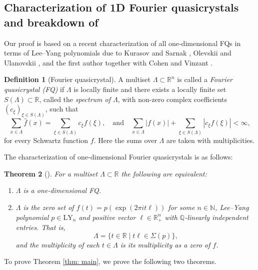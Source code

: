 \documentclass[11pt,letterpaper]{amsart}
\theoremstyle{definition}
\newtheorem{Def}{Definition}[section]
\theoremstyle{plain}
\newtheorem{thm}[Def]{Theorem}
\newcommand{\R}{{\mathbb R}}
\newcommand{\Q}{{\mathbb Q}}
\newcommand{\N}{{\mathbb N}}
\begin{document}
\subsection{Characterization of 1D Fourier quasicrystals and breakdown of }
Our proof is based on a recent characterization of all one-dimensional FQs in terms of Lee--Yang polynomials due to Kurasov and Sarnak \cite{kurasovsarnak}, Olevskii and Ulanovskii \cite{olevskii2020fourier}, and the first author together with Cohen and Vinzant \cite{AlonCohenVinzant}.   
\begin{Def}[Fourier quasicrystal]\label{def:FQ}
    A multiset $\Lambda\subset\R^n$ is called a \emph{Fourier quasicrystal (FQ)} if $\Lambda$ is locally finite and there exists a locally finite set $S(\Lambda)\subset\R$, called the \emph{spectrum of $\Lambda$}, with non-zero complex coefficients $\left(c_{\xi}\right)_{\xi\in S(\Lambda)}$, such that 
    \[\sum_{x\in\Lambda}\hat{f}(x)=\sum_{\xi\in S(\Lambda)}c_{\xi}{f}(\xi),\quad\text{and}\quad \sum_{x\in\Lambda}|{f}(x)|+\sum_{\xi\in S(\Lambda)}|c_{\xi}{f}(\xi)|<\infty,\]
    for every Schwartz function $f$. Here the sums over $\Lambda$ are taken with multiplicities.
\end{Def}
The characterization of one-dimensional Fourier quasicrystals is as follows: 
\begin{thm}[\cites{kurasovsarnak,olevskii2020fourier,AlonCohenVinzant,AlonVinzant}]\label{thm:1dFQ}
    For a multiset $\Lambda\subset\R$ the following are equivalent:
    \begin{enumerate}
        \item $\Lambda$ is a one-dimensional FQ.
        \item $\Lambda$ is the zero set of $f(t)=p(\exp(2\pi it\ell))$ for some $n\in\N$, Lee--Yang polynomial $p\in\mathrm{LY}_{n}$ and positive vector $\ell\in\R^{n}_{+}$ with $\Q$-linearly independent entries. That is,
        \[\Lambda=\{t\in\R\mid t\ell\in\Sigma(p)\},\]
        and the multiplicity of each $t\in\Lambda$ is its multiplicity as a zero of $f$.
    \end{enumerate}
\end{thm}
To prove Theorem \ref{thm: main}, we prove the following two theorems.
\end{document}
